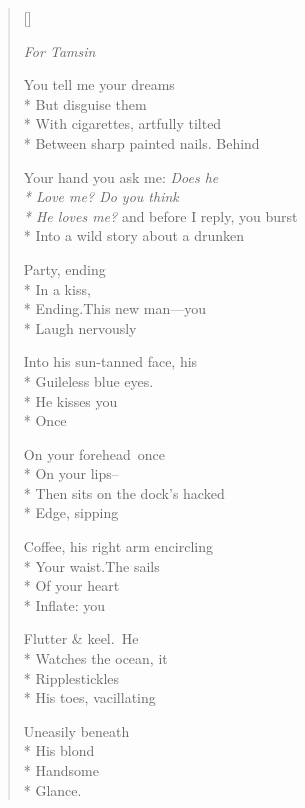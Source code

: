 \label{ch:what_i_meant_to_ask}
\begin{verse}[\versewidth]
\epigraph{\textit{For Tamsin}}{}
You tell me your dreams\\*
But disguise them\\*
With cigarettes, artfully tilted\\*
Between sharp painted nails. Behind

Your hand you ask me: \textit{Does he\\*
Love me? Do you think\\*
He loves me?} and before I reply, you burst\\*
Into a wild story about a drunken

Party, ending\\*
In a kiss,\\*
Ending.\quad This new man---you\\*
Laugh nervously

Into his sun-tanned face, his\\*
Guileless blue eyes.\\*
He kisses you\\*
Once

On your forehead\qquad once\\*
On your lips--\\*
Then sits on the dock's hacked\\*
Edge, sipping

Coffee, his right arm encircling\\*
Your waist.\quad The sails\\*
Of your heart\\*
Inflate: you

Flutter \& keel.\quad He\\*
Watches the ocean, it\\*
Ripples\qquad tickles\\*
His toes, vacillating

Uneasily beneath\\*
His blond\\*
Handsome\\*
Glance.
\end{verse}

